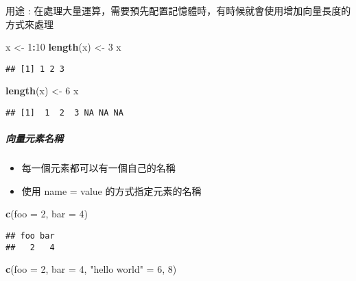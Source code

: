\documentclass[
]{article}
\newenvironment{Shaded}{\begin{snugshade}}{\end{snugshade}}
\newcommand{\DataTypeTok}[1]{\textcolor[rgb]{0.13,0.29,0.53}{#1}}
\newcommand{\DecValTok}[1]{\textcolor[rgb]{0.00,0.00,0.81}{#1}}
\newcommand{\KeywordTok}[1]{\textcolor[rgb]{0.13,0.29,0.53}{\textbf{#1}}}
\newcommand{\NormalTok}[1]{#1}
\newcommand{\OperatorTok}[1]{\textcolor[rgb]{0.81,0.36,0.00}{\textbf{#1}}}
\newcommand{\StringTok}[1]{\textcolor[rgb]{0.31,0.60,0.02}{#1}}
\providecommand{\tightlist}{%
  \setlength{\itemsep}{0pt}\setlength{\parskip}{0pt}}
\begin{document}
用途 :
在處理大量運算，需要預先配置記憶體時，有時候就會使用增加向量長度的方式來處理

\begin{Shaded}
\begin{Highlighting}[]
\NormalTok{x <-}\StringTok{ }\DecValTok{1}\OperatorTok{:}\DecValTok{10}
\KeywordTok{length}\NormalTok{(x) <-}\StringTok{ }\DecValTok{3}
\NormalTok{x}
\end{Highlighting}
\end{Shaded}

\begin{verbatim}
## [1] 1 2 3
\end{verbatim}

\begin{Shaded}
\begin{Highlighting}[]
\KeywordTok{length}\NormalTok{(x) <-}\StringTok{ }\DecValTok{6}
\NormalTok{x}
\end{Highlighting}
\end{Shaded}

\begin{verbatim}
## [1]  1  2  3 NA NA NA
\end{verbatim}

\hypertarget{ux5411ux91cfux5143ux7d20ux540dux7a31}{%
\subparagraph{向量元素名稱}\label{ux5411ux91cfux5143ux7d20ux540dux7a31}}

\begin{itemize}
\tightlist
\item
  每一個元素都可以有一個自己的名稱
\item
  使用 name = value 的方式指定元素的名稱
\end{itemize}

\begin{Shaded}
\begin{Highlighting}[]
\KeywordTok{c}\NormalTok{(}\DataTypeTok{foo =} \DecValTok{2}\NormalTok{, }\DataTypeTok{bar =} \DecValTok{4}\NormalTok{)}
\end{Highlighting}
\end{Shaded}

\begin{verbatim}
## foo bar 
##   2   4
\end{verbatim}

\begin{Shaded}
\begin{Highlighting}[]
\KeywordTok{c}\NormalTok{(}\DataTypeTok{foo =} \DecValTok{2}\NormalTok{, }\DataTypeTok{bar =} \DecValTok{4}\NormalTok{, }\StringTok{"hello world"}\NormalTok{ =}\StringTok{ }\DecValTok{6}\NormalTok{, }\DecValTok{8}\NormalTok{)}
\end{Highlighting}
\end{Shaded}
\end{document}
